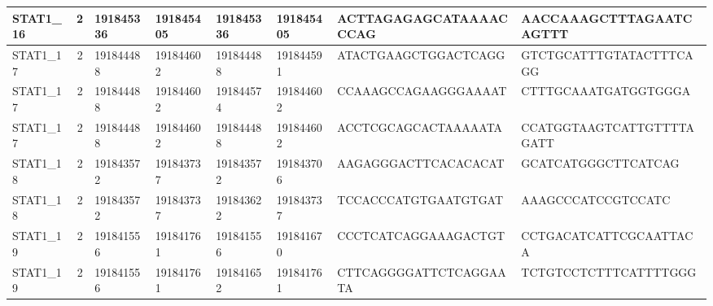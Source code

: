 \begin{landscape}
\begin{longtable}{| p{} | p{} | p{} | p{} | p{} | p{} | p{} | p{} |}
\multicolumn{1}{|l|}{STAT1\_16}  & \multicolumn{1}{c|}{2}  & \multicolumn{1}{l|}{191845336} & \multicolumn{1}{l|}{191845405} & \multicolumn{1}{l|}{191845336} & \multicolumn{1}{l|}{191845405} & \multicolumn{1}{l|}{ACTTAGAGAGCATAAAACCCAG}          & \multicolumn{1}{l|}{AACCAAAGCTTTAGAATCAGTTT}       \\ \hline
\multicolumn{1}{|l|}{STAT1\_17}  & \multicolumn{1}{c|}{2}  & \multicolumn{1}{l|}{191844488} & \multicolumn{1}{l|}{191844602} & \multicolumn{1}{l|}{191844488} & \multicolumn{1}{l|}{191844591} & \multicolumn{1}{l|}{ATACTGAAGCTGGACTCAGG}            & \multicolumn{1}{l|}{GTCTGCATTTGTATACTTTCAGG}       \\ \hline
\multicolumn{1}{|l|}{STAT1\_17}  & \multicolumn{1}{c|}{2}  & \multicolumn{1}{l|}{191844488} & \multicolumn{1}{l|}{191844602} & \multicolumn{1}{l|}{191844574} & \multicolumn{1}{l|}{191844602} & \multicolumn{1}{l|}{CCAAAGCCAGAAGGGAAAAT}            & \multicolumn{1}{l|}{CTTTGCAAATGATGGTGGGA}          \\ \hline
\multicolumn{1}{|l|}{STAT1\_17}  & \multicolumn{1}{c|}{2}  & \multicolumn{1}{l|}{191844488} & \multicolumn{1}{l|}{191844602} & \multicolumn{1}{l|}{191844488} & \multicolumn{1}{l|}{191844602} & \multicolumn{1}{l|}{ACCTCGCAGCACTAAAAATA}            & \multicolumn{1}{l|}{CCATGGTAAGTCATTGTTTTAGATT}     \\ \hline
\multicolumn{1}{|l|}{STAT1\_18}  & \multicolumn{1}{c|}{2}  & \multicolumn{1}{l|}{191843572} & \multicolumn{1}{l|}{191843737} & \multicolumn{1}{l|}{191843572} & \multicolumn{1}{l|}{191843706} & \multicolumn{1}{l|}{AAGAGGGACTTCACACACAT}            & \multicolumn{1}{l|}{GCATCATGGGCTTCATCAG}           \\ \hline
\multicolumn{1}{|l|}{STAT1\_18}  & \multicolumn{1}{c|}{2}  & \multicolumn{1}{l|}{191843572} & \multicolumn{1}{l|}{191843737} & \multicolumn{1}{l|}{191843622} & \multicolumn{1}{l|}{191843737} & \multicolumn{1}{l|}{TCCACCCATGTGAATGTGAT}            & \multicolumn{1}{l|}{AAAGCCCATCCGTCCATC}            \\ \hline
\multicolumn{1}{|l|}{STAT1\_19}  & \multicolumn{1}{c|}{2}  & \multicolumn{1}{l|}{191841556} & \multicolumn{1}{l|}{191841761} & \multicolumn{1}{l|}{191841556} & \multicolumn{1}{l|}{191841670} & \multicolumn{1}{l|}{CCCTCATCAGGAAAGACTGT}            & \multicolumn{1}{l|}{CCTGACATCATTCGCAATTACA}        \\ \hline
\multicolumn{1}{|l|}{STAT1\_19}  & \multicolumn{1}{c|}{2}  & \multicolumn{1}{l|}{191841556} & \multicolumn{1}{l|}{191841761} & \multicolumn{1}{l|}{191841652} & \multicolumn{1}{l|}{191841761} & \multicolumn{1}{l|}{CTTCAGGGGATTCTCAGGAATA}          & \multicolumn{1}{l|}{TCTGTCCTCTTTCATTTTGGG}         \\ \hline

\end{longtable}
\end{landscape}
